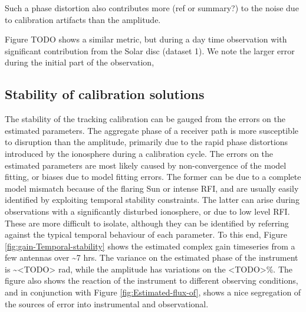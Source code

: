 \documentclass{aa}
\begin{document}
 Such a  phase distortion also contributes more  (ref or summary?) to
the noise due to calibration artifacts than the amplitude.

Figure  TODO shows  a similar  metric, but  during a  day time  observation with
significant contribution  from the  Solar disc (dataset  1). We note  the larger
error during the initial part of the observation,

\subsection{\label{sub:Stability}Stability of calibration solutions}

The stability of  the tracking calibration can be gauged from  the errors on the
estimated parameters. The aggregate phase of a receiver path is more susceptible
to disruption than  the amplitude, primarily due to  the rapid phase distortions
introduced  by the  ionosphere during  a calibration  cycle. The  errors  on the
estimated  parameters are  most likely  caused by  non-convergence of  the model
fitting, or  biases due  to model  fitting errors. The  former can  be due  to a
complete  model mismatch  because of  the flaring  Sun or  intense RFI,  and are
usually  easily identified  by exploiting  temporal stability  constraints.  The
latter can arise during  observations with a significantly disturbed ionosphere,
or due to low level RFI.  These are more difficult to isolate, although they can
be  identified by  referring  against  the typical  temporal  behaviour of  each
parameter.   To  this end,  Figure  \ref{fig:gain-Temporal-stability} shows  the
estimated complex  gain timeseries from  a few antennas  over \textasciitilde{}7
hrs.   The   variance   on   the   estimated  phase   of   the   instrument   is
\textasciitilde{}<TODO> rad, while the amplitude has variations on the <TODO>\%.
The  figure also shows  the reaction  of the  instrument to  different observing
conditions, and  in conjunction with Figure  \ref{fig:Estimated-flux-of}, shows a
nice segregation of the sources of error into instrumental and observational.
\end{document}
